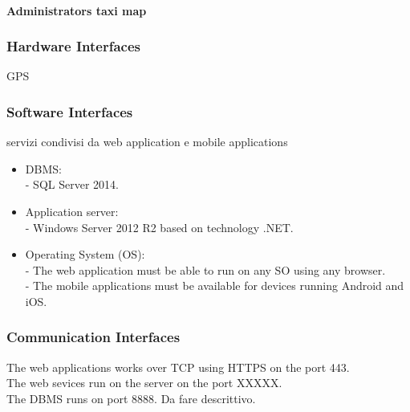 \documentclass{article}
\begin{document}
            \paragraph{Administrators taxi map}
        \subsubsection{Hardware Interfaces}
            GPS
        \subsubsection{Software Interfaces}
            servizi condivisi da web application e mobile applications
            \begin{itemize}
                \item DBMS: \\
                - SQL Server 2014.
                \item Application server: \\
                - Windows Server 2012 R2 based on technology .NET.
                \item Operating System (OS): \\
                - The web application must be able to run on any SO using any browser. \\
                - The mobile applications must be available for devices running Android and iOS.
            \end{itemize}
        \subsubsection{Communication Interfaces}
            The web applications works over TCP using HTTPS on the port 443.\\
            The web sevices run on the server on the port XXXXX.\\
            The DBMS runs on port 8888.
            Da fare descrittivo.
            
            
\end{document}
